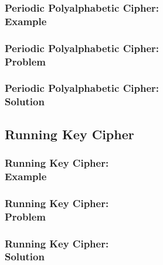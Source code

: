 \documentclass{uva-inf-presentation}
\begin{document}
\begin{frame}
\frametitle{Periodic Polyalphabetic Cipher:\\ Example}
\end{frame}

\begin{frame}
\frametitle{Periodic Polyalphabetic Cipher:\\ Problem}
\end{frame}

\begin{frame}
\frametitle{Periodic Polyalphabetic Cipher:\\ Solution}
\end{frame}

\subsection{Running Key Cipher}
\frame{\tableofcontents[currentsubsection]}

\begin{frame}
\frametitle{Running Key Cipher:\\ Example}
\end{frame}

\begin{frame}
\frametitle{Running Key Cipher:\\ Problem}
\end{frame}

\begin{frame}
\frametitle{Running Key Cipher:\\ Solution}
\end{frame}

\end{document}
